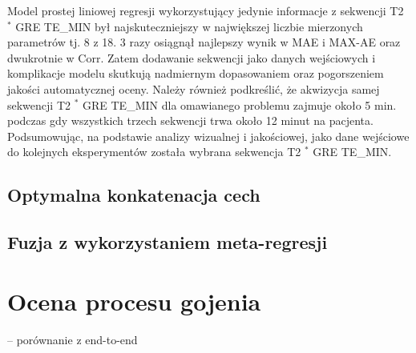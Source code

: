 Model prostej liniowej regresji wykorzystujący jedynie informacje z sekwencji T2 $^\ast$ GRE TE\_MIN był najskuteczniejszy w największej liczbie mierzonych parametrów tj. 8 z 18. 3 razy osiągnął najlepszy wynik w MAE i MAX-AE oraz dwukrotnie w Corr. Zatem dodawanie sekwencji jako danych wejściowych i komplikacje modelu skutkują nadmiernym dopasowaniem oraz pogorszeniem jakości automatycznej oceny. Należy również podkreślić, że akwizycja samej sekwencji T2 $^\ast$ GRE TE\_MIN dla omawianego problemu zajmuje około 5 min. podczas gdy wszystkich trzech sekwencji trwa około 12 minut na pacjenta. Podsumowując, na podstawie analizy wizualnej i jakościowej, jako dane wejściowe do kolejnych eksperymentów została wybrana sekwencja T2 $^\ast$ GRE TE\_MIN. 

\subsection{Optymalna konkatenacja cech}
\subsection{Fuzja z wykorzystaniem meta-regresji}



\section{Ocena procesu gojenia}

-- porównanie z end-to-end




